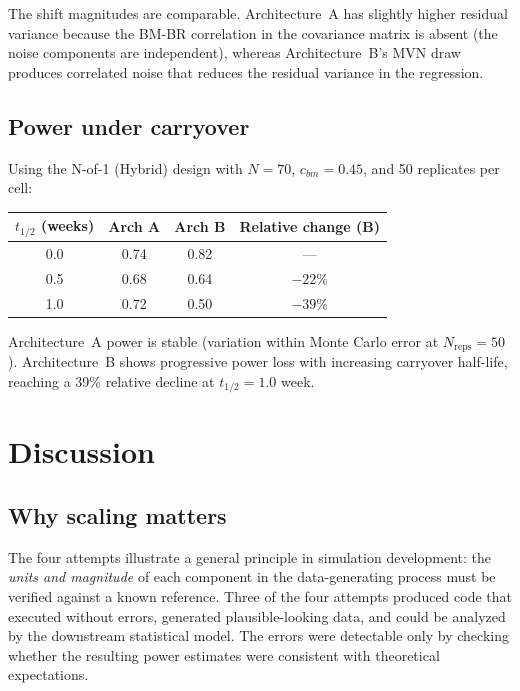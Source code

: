 \documentclass[11pt]{article}
\begin{document}
The shift magnitudes are comparable. Architecture~A has
slightly higher residual variance because the BM-BR
correlation in the covariance matrix is absent (the noise
components are independent), whereas Architecture~B's MVN
draw produces correlated noise that reduces the residual
variance in the regression.

\subsection{Power under carryover}

Using the N-of-1 (Hybrid) design with $N = 70$,
$c_{bm} = 0.45$, and 50 replicates per cell:

\begin{center}
\begin{tabular}{cccc}
\toprule
$t_{1/2}$ (weeks) & \textbf{Arch A} & \textbf{Arch B}
  & \textbf{Relative change (B)} \\
\midrule
0.0 & 0.74 & 0.82 & --- \\
0.5 & 0.68 & 0.64 & $-22\%$ \\
1.0 & 0.72 & 0.50 & $-39\%$ \\
\bottomrule
\end{tabular}
\end{center}

Architecture~A power is stable (variation within Monte Carlo
error at $N_{\text{reps}} = 50$). Architecture~B shows
progressive power loss with increasing carryover half-life,
reaching a 39\% relative decline at $t_{1/2} = 1.0$ week.

\section{Discussion}

\subsection{Why scaling matters}

The four attempts illustrate a general principle in
simulation development: the \emph{units and magnitude} of
each component in the data-generating process must be
verified against a known reference. Three of the four
attempts produced code that executed without errors,
generated plausible-looking data, and could be analyzed by
the downstream statistical model. The errors were detectable
only by checking whether the resulting power estimates were
consistent with theoretical expectations.
\end{document}
